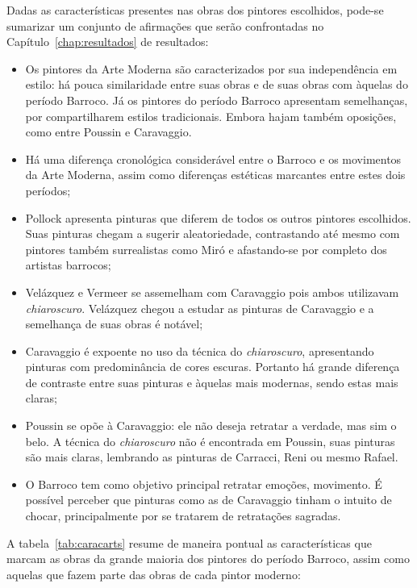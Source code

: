 Dadas as características presentes nas obras dos pintores escolhidos,
pode-se sumarizar um conjunto de afirmações que serão confrontadas no
Capítulo~\ref{chap:resultados} de resultados:

\begin{itemize}
\item Os pintores da Arte Moderna são caracterizados por sua
  independência em estilo: há pouca similaridade entre suas obras e de
  suas obras com àquelas do período Barroco. Já os pintores do período
  Barroco apresentam semelhanças, por compartilharem estilos
  tradicionais. Embora hajam também oposições, como entre Poussin e
  Caravaggio.

\item Há uma diferença cronológica considerável entre o Barroco
  e os movimentos da Arte Moderna, assim como diferenças estéticas
  marcantes entre estes dois períodos;

\item Pollock apresenta pinturas que diferem de todos os outros
  pintores escolhidos. Suas pinturas chegam a sugerir aleatoriedade,
  contrastando até mesmo com pintores também surrealistas como Miró e
  afastando-se por completo dos artistas barrocos;

\item Velázquez e Vermeer se assemelham com Caravaggio pois ambos
  utilizavam \textit{chiaroscuro}. Velázquez chegou a estudar as
  pinturas de Caravaggio e a semelhança de suas obras é notável;

\item Caravaggio é expoente no uso da técnica do
  \textit{chiaroscuro}, apresentando pinturas com predominância de
  cores escuras. Portanto há grande diferença de contraste entre suas
  pinturas e àquelas mais modernas, sendo estas mais claras;

\item Poussin se opõe à Caravaggio: ele não deseja retratar a verdade, 
mas sim o belo. A técnica do \textit{chiaroscuro} não é encontrada em
Poussin, suas pinturas são mais claras, lembrando as pinturas de
Carracci, Reni ou mesmo Rafael.

\item O Barroco tem como objetivo principal retratar emoções,
  movimento. É possível perceber que pinturas como as de Caravaggio
  tinham o intuito de chocar, principalmente por se tratarem de
  retratações sagradas.
\end{itemize}

A tabela~\ref{tab:caracarts} resume de maneira pontual as
características que marcam as obras da grande maioria dos pintores do
período Barroco, assim como aquelas que fazem parte das obras de cada
pintor moderno:

